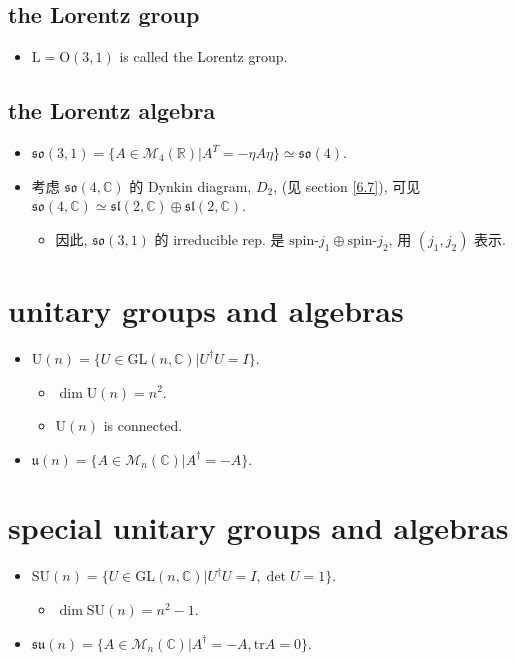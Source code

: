 \subsection{the Lorentz group}
\begin{itemize}
	\item $\mathrm{L} = \mathrm{O}(3, 1)$ is called the Lorentz group.
\end{itemize}

\subsection{the Lorentz algebra}
\begin{itemize}
	\item $\mathfrak{so}(3, 1) = \{A \in \mathcal{M}_4(\mathbb{R}) | A^T = - \eta A \eta\} \simeq \mathfrak{so}(4)$.
	
	\item 考虑 $\mathfrak{so}(4, \mathbb{C})$ 的 Dynkin diagram, $D_2$, (见 section \ref{6.7}), 可见 $\mathfrak{so}(4, \mathbb{C}) \simeq \mathfrak{sl}(2, \mathbb{C}) \oplus \mathfrak{sl}(2, \mathbb{C})$.
	\begin{itemize}
		\item 因此, $\mathfrak{so}(3, 1)$ 的 irreducible rep. 是 $\text{spin-} j_1 \oplus \text{spin-} j_2$, 用 $(j_1, j_2)$ 表示.
	\end{itemize}
\end{itemize}

\section{unitary groups and algebras}
\begin{itemize}
	\item $\mathrm{U}(n) = \{U \in \mathrm{GL}(n, \mathbb{C}) | U^\dag U = I\}$.
	\begin{itemize}
		\item $\dim \mathrm{U}(n) = n^2$.
		
		\item $\mathrm{U}(n)$ is connected.
	\end{itemize}
	
	\item $\mathfrak{u}(n) = \{A \in \mathcal{M}_n(\mathbb{C}) | A^\dag = - A\}$.
\end{itemize}

\section{special unitary groups and algebras}
\begin{itemize}
	\item $\mathrm{SU}(n) = \{U \in \mathrm{GL}(n, \mathbb{C}) | U^\dag U = I, \det U = 1\}$.
	\begin{itemize}
		\item $\dim \mathrm{SU}(n) = n^2 - 1$.
	\end{itemize}
	
	\item $\mathfrak{su}(n) = \{A \in \mathcal{M}_n(\mathbb{C}) | A^\dag = - A, \mathrm{tr} A = 0\}$.
\end{itemize}

